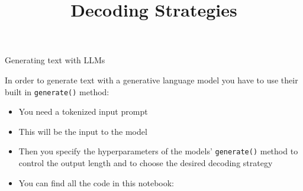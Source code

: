 



\newcommand{\learninggoals}{
\item Learn how to use the \texttt{generate()} function of the \texttt{Transformers} library
\item Learn how to choose from the different decoding strategies with the choice of hyperparameters
\item See how hyperparameters affect the output of the \texttt{generate()} function
}
\def\myblue#1{\textcolor{texblue}{#1}}

\title{Decoding Strategies}
\date{}




\begin{frame}{Generating text with LLM\MakeLowercase{s}}

\vfill

In order to generate text with a generative language model you have to use their built in \texttt{generate()} method: 

\vfill

\begin{itemize}
    \item You need a tokenized input prompt
    \item This will be the input to the model 
    \item Then you specify the hyperparameters of the models' \texttt{generate()} method to control the output length and to choose the desired decoding strategy
    \item You can find all the code in this notebook: 
\end{itemize}

\vfill
    
\end{frame}



